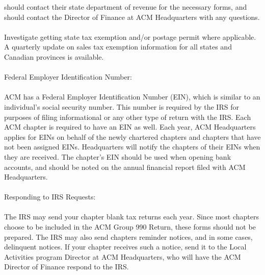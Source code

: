 should contact their state department of revenue for the necessary forms, and
should contact the Director of Finance at ACM Headquarters with any questions.
\\
\\
Investigate getting state tax exemption and/or postage permit where applicable.
A quarterly update on sales tax exemption information for all states and
Canadian provinces is available.
\\
\\
Federal Employer Identification Number:
\\
\\
ACM has a Federal Employer Identification Number (EIN), which is similar to an
individual's social security number. This number is required by the IRS for
purposes of filing informational or any other type of return with the IRS. Each
ACM chapter is required to have an EIN as well. Each year, ACM Headquarters
applies for EINs on behalf of the newly chartered chapters and chapters that
have not been assigned EINs. Headquarters will notify the chapters of their
EINs when they are received. The chapter's EIN should be used when opening
bank accounts, and should be noted on the annual financial report filed with
ACM Headquarters.
\\
\\
Responding to IRS Requests:
\\
\\
The IRS may send your chapter blank tax returns each year. Since most chapters
choose to be included in the ACM Group 990 Return, these forms should not be
prepared. The IRS may also send chapters reminder notices, and in some cases,
delinquent notices. If your chapter receives such a notice, send it to the Local
Activities program Director at ACM Headquarters, who will have the ACM Director
of Finance respond to the IRS.


